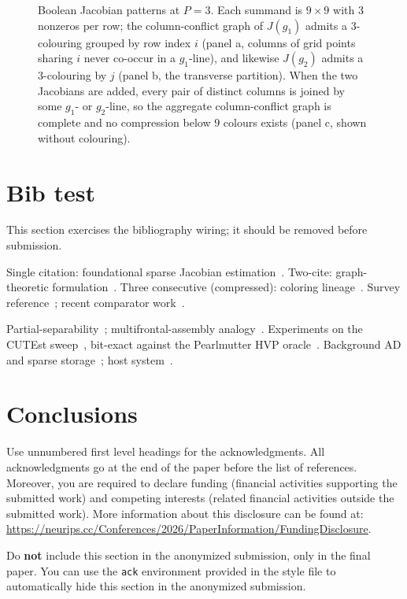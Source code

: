 \documentclass{article}
\begin{document}
\begin{figure}
\begin{tikzpicture}[
    scale=0.36,
    lbl/.style={font=\scriptsize},
    sym/.style={font=\Large},
  ]
  \end{tikzpicture}
  \caption{Boolean Jacobian patterns at $P=3$. Each summand is $9{\times}9$ with $3$ nonzeros per
  row; the column-conflict graph of $J(g_1)$ admits a $3$-colouring grouped by row index $i$
  (panel a, columns of grid points sharing $i$ never co-occur in a $g_1$-line), and likewise
  $J(g_2)$ admits a $3$-colouring by $j$ (panel b, the transverse partition). When the two
  Jacobians are added, every pair of distinct columns is joined by some $g_1$- or $g_2$-line,
  so the aggregate column-conflict graph is complete and no compression below $9$ colours
  exists (panel c, shown without colouring).}
  \end{figure}


\section{Bib test}
\label{sec:bibtest}

This section exercises the bibliography wiring; it should be removed before submission.

Single citation: foundational sparse Jacobian estimation~\cite{curtispowellreid1974sparse}.
Two-cite: graph-theoretic formulation~\cite{colemanmore1983jacobian, colemanmore1984hessian}.
Three consecutive (compressed): coloring lineage~\cite{curtispowellreid1974sparse,
powelltoint1979sparse, colemanmore1983jacobian}.
Survey reference~\cite{gebremedhin2005color}; recent comparator
work~\cite{hilldalle2025sparser, dallehill2026common}.

Partial-separability~\cite{griewanktoint1982partitioned, conngouldtoint1992lancelot};
multifrontal-assembly analogy~\cite{duffreid1983multifrontal, liu1992multifrontal}.
Experiments on the CUTEst sweep~\cite{gouldorbantoint2014cutest, bongartz1995cute},
bit-exact against the Pearlmutter HVP oracle~\cite{pearlmutter1994fast}.
Background AD and sparse storage~\cite{griewankwalther2008evaluating, baydin2018automatic,
saad2003iterative}; host system~\cite{frostigjohnsonleary2018compiling, jax2018github}.

\section{Conclusions}


\begin{ack}
Use unnumbered first level headings for the acknowledgments. All acknowledgments
go at the end of the paper before the list of references. Moreover, you are required to declare
funding (financial activities supporting the submitted work) and competing interests (related financial activities outside the submitted work).
More information about this disclosure can be found at: \url{https://neurips.cc/Conferences/2026/PaperInformation/FundingDisclosure}.


Do {\bf not} include this section in the anonymized submission, only in the final paper. You can use the \texttt{ack} environment provided in the style file to automatically hide this section in the anonymized submission.
\end{ack}
\end{document}
